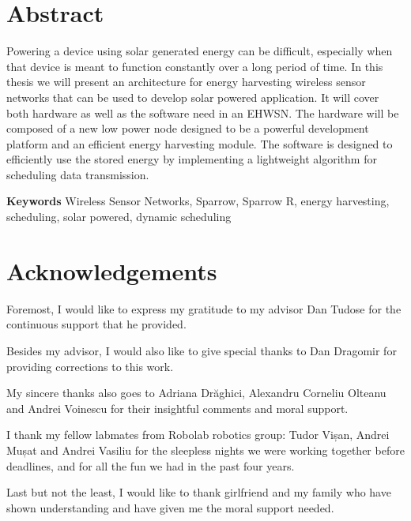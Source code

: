 \chapter*{Abstract}

Powering a device using solar generated energy can be difficult, especially when that device is
meant to function constantly over a long period of time. In this thesis we will present an
architecture for energy harvesting wireless sensor networks that can be used to develop solar
powered application. It will cover both hardware as well as the software need in an EHWSN.
The hardware will be composed of a new low power node designed to be a powerful development
platform and an efficient energy harvesting module. The software is designed to efficiently use the
stored energy by implementing a lightweight algorithm for scheduling data transmission.




\textbf{Keywords} Wireless Sensor Networks, Sparrow, Sparrow R, energy harvesting, scheduling,
solar powered, dynamic scheduling

\chapter*{Acknowledgements}

Foremost, I would like to express my gratitude to my advisor Dan Tudose for the continuous support that he provided.

Besides my advisor, I would also like to give special thanks to Dan Dragomir for providing corrections to this work.

My sincere thanks also goes to Adriana Drăghici, Alexandru Corneliu Olteanu and Andrei Voinescu for their insightful comments  and moral support.

I thank my fellow labmates from Robolab robotics group: Tudor Vișan, Andrei Mușat and Andrei Vasiliu for the sleepless nights we were working together before deadlines, and for all the fun we had in the past four years.

Last but not the least, I would like to thank girlfriend and my family who have shown understanding and have given me the moral support needed.

